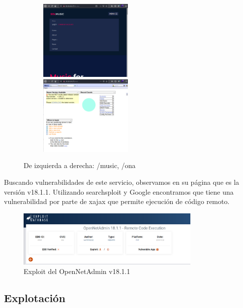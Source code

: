 \documentclass{article}
\begin{document}
\begin{figure}[H]
	\center
	\begin{subfigure}[c]{\linewidth}
	\includegraphics[width=0.5\textwidth]{images/openadmin/4-musicdetalles.png}
	\includegraphics[width=0.5\textwidth]{images/openadmin/5-ona.png}
	\end{subfigure}
	\caption{De izquierda a derecha: /music, /ona}
\end{figure}

Buscando vulnerabilidades de este servicio, observamos en su página que es la versión v18.1.1. Utilizando searchsploit y Google encontramos que tiene una vulnerabilidad por parte de xajax que permite ejecución de código remoto.
\begin{figure}[H]
	\center
	\includegraphics[width=0.8\textwidth]{images/openadmin/6-exploit.png}
	\caption{Exploit del OpenNetAdmin v18.1.1}
\end{figure}

\subsection{Explotación}
\end{document}
